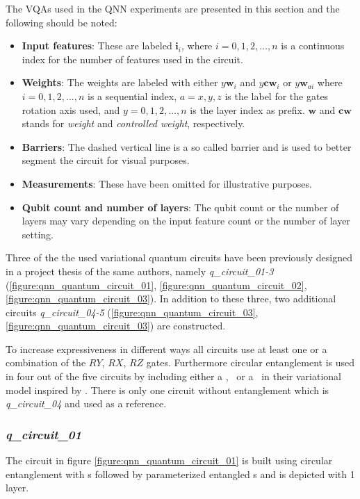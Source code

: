 The VQAs used in the QNN experiments are presented in this section and the following should be noted:

\begin{itemize}
  \item \textbf{Input features}: These are labeled $\mathbf{i}_i$, where $i = 0,1,2,...,n$ is a continuous index for the number of features used in the circuit.
  \item \textbf{Weights}: The weights are labeled with either $y\mathbf{w}_i$ and $y\mathbf{cw}_i$ or $y\mathbf{w}_{ai}$ where $i = 0,1,2,...,n$ is a sequential index, $a = x,y,z$ is the label for the gates rotation axis used, and $y = 0,1,2,...,n$ is the layer index as prefix. $\mathbf{w}$ and $\mathbf{cw}$ stands for \textit{weight} and \textit{controlled weight}, respectively.
  \item \textbf{Barriers}: The dashed vertical line is a so called barrier and is used to better segment the circuit for visual purposes.
  \item \textbf{Measurements}: These have been omitted for illustrative purposes.
  \item \textbf{Qubit count and number of layers}: The qubit count or the number of layers may vary depending on the input feature count or the number of layer setting.
\end{itemize}

Three of the the used variational quantum circuits have been previously designed in a project thesis of the same authors\cite{monteirosimoesImplementingNeuralNetworks2021}, namely \textit{q\_circuit\_01-3} (\ref{figure:qnn_quantum_circuit_01}, \ref{figure:qnn_quantum_circuit_02}, \ref{figure:qnn_quantum_circuit_03}). In addition to these three, two additional circuits \textit{q\_circuit\_04-5} (\ref{figure:qnn_quantum_circuit_03}, \ref{figure:qnn_quantum_circuit_03}) are constructed. \par
To increase expressiveness in different ways\cite{sim_expressibility_2019} all circuits use at least one or a combination of the $RY$, $RX$, $RZ$ gates. Furthermore circular entanglement is used in four out of the five circuits by including either a \cxgate, \czgate\ or a \crzgate\ in their variational model inspired by \cite{schuldCircuitcentricQuantumClassifiers2020}. There is only one circuit without entanglement which is \textit{q\_circuit\_04} and used as a reference. 

\clearpage

\subsubsection{\textit{q\_circuit\_01}}
\label{subsubsection:qnn_quantum_circuit_01}
The circuit in figure \ref{figure:qnn_quantum_circuit_01} is built using circular entanglement with \rygate s followed by parameterized entangled \crygate s and is depicted with 1 layer. 

